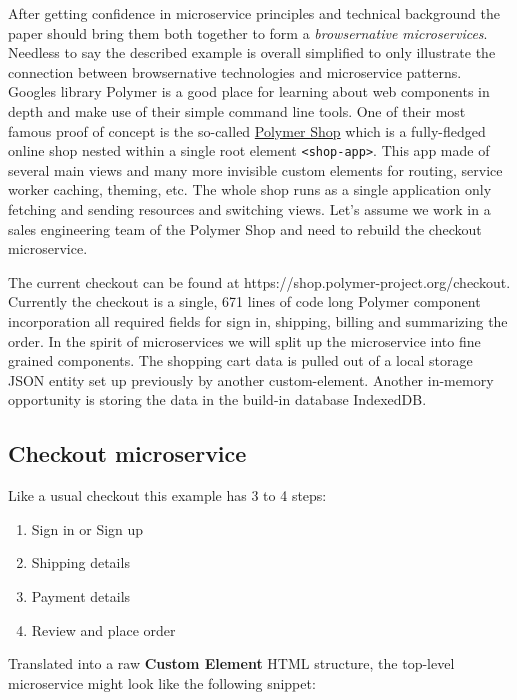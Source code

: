 \documentclass[]{article}
\providecommand{\tightlist}{%
  \setlength{\itemsep}{0pt}\setlength{\parskip}{0pt}}
\begin{document}
After getting confidence in microservice principles and technical
background the paper should bring them both together to form a
\emph{browsernative microservices}. Needless to say the described
example is overall simplified to only illustrate the connection between
browsernative technologies and microservice patterns. Googles library
Polymer is a good place for learning about web components in depth and
make use of their simple command line tools. One of their most famous
proof of concept is the so-called
\href{https://shop.polymer-project.org/}{Polymer Shop} which is a
fully-fledged online shop nested within a single root element
\texttt{\textless{}shop-app\textgreater{}}. This app made of several
main views and many more invisible custom elements for routing, service
worker caching, theming, etc. The whole shop runs as a single
application only fetching and sending resources and switching views.
Let's assume we work in a sales engineering team of the Polymer Shop and
need to rebuild the checkout microservice.

The current checkout can be found at
https://shop.polymer-project.org/checkout. Currently the checkout is a
single, 671 lines of code long Polymer component incorporation all
required fields for sign in, shipping, billing and summarizing the
order. In the spirit of microservices we will split up the microservice
into fine grained components. The shopping cart data is pulled out of a
local storage JSON entity set up previously by another custom-element.
Another in-memory opportunity is storing the data in the build-in
database IndexedDB.

\subsection{Checkout microservice}\label{checkout-microservice}

Like a usual checkout this example has 3 to 4 steps:

\begin{enumerate}
\def\labelenumi{\arabic{enumi}.}
\tightlist
\item
  Sign in or Sign up
\item
  Shipping details
\item
  Payment details
\item
  Review and place order
\end{enumerate}

Translated into a raw \textbf{Custom Element} HTML structure, the
top-level microservice might look like the following snippet:
\end{document}
